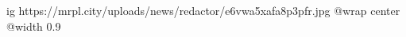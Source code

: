  
 
 
 
 

\ifcmt
  ig https://mrpl.city/uploads/news/redactor/e6vwa5xafa8p3pfr.jpg
  @wrap center
  @width 0.9
\fi
